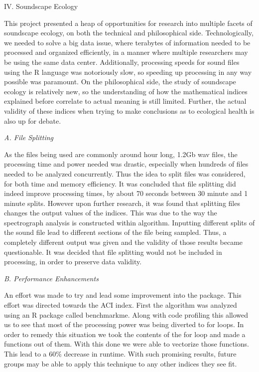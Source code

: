 \begin{center}
IV. Soundscape Ecology
\end{center}
\begin{flushleft}
\setlength{\parindent}{0.125in}
This project presented a heap of opportunities for research into multiple facets of soundscape ecology, on both the technical and philosophical side. Technologically, we needed to solve a big data issue, where terabytes of information needed to be processed and organized efficiently, in a manner where multiple researchers may be using the same data center. Additionally, processing speeds for sound files using the R language was notoriously slow, so speeding up processing in any way possible was paramount. On the philosophical side, the study of soundscape ecology is relatively new, so the understanding of how the mathematical indices explained before correlate to actual meaning is still limited. Further, the actual validity of these indices when trying to make conclusions as to ecological health is also up for debate.\par

\noindent\textit{A. File Splitting}\par
As the files being used are commonly around hour long, 1.2Gb wav files, the processing time and power needed was drastic, especially when hundreds of files needed to be analyzed concurrently. Thus the idea to split files was considered, for both time and memory efficiency. It was concluded that file splitting did indeed improve processing times, by about 70 seconds between 30 minute and 1 minute splits. However upon further research, it was found that splitting files changes the output values of the indices. This was due to the way the spectrograph analysis is constructed within algorithm. Inputting different splits of the sound file lead to different sections of the file being sampled. Thus, a completely different output was given and the validity of those results became questionable. It was decided that file splitting would not be included in processing, in order to preserve data validity.\par

\noindent\textit{B. Performance Enhancements}\par
An effort was made to try and lead some improvement into the package. This effort was directed towards the ACI index. First the algorithm was analyzed using an R package called benchmarkme. Along with code profiling this allowed us to see that most of the processing power was being diverted to for loops. In order to remedy this situation we took the contents of the for loop and made a functions out of them. With this done we were able to vectorize those functions. This lead to a 60\% decrease in runtime. With such promising results, future groups may be able to apply this technique to any other indices they see fit.\par


\end{flushleft}
